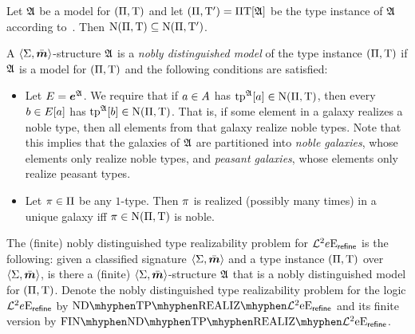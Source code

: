 \begin{remark}\label{rem:str-tpi-noble-sub}
Let $\mathfrak{A}$ be a model for $(\Pi,\mathrm{T})$ and let $(\Pi,{\mathrm{T}'}) =
\Pi\mathrm{T}[\mathfrak{A}]$ be the type instance of $\mathfrak{A}$ according
to~. Then $\mathrm{\mathrm{N}}(\Pi,\mathrm{T}) \subseteq
\mathrm{\mathrm{N}}(\Pi,{\mathrm{T}'})$.
\end{remark}

\begin{definition}
A $\left\langle \mathrm{\Sigma},\bar{\bm{m}} \right\rangle$-structure $\mathfrak{A}$ is a \emph{nobly distinguished model} of
the type instance $(\Pi,\mathrm{T})$ if $\mathfrak{A}$ is a model for $(\Pi,\mathrm{T})$
and the following conditions are satisfied:
\begin{itemize}
  \item[\condrealizd]\label{cond:realizd}
  Let $E = \bm{e}^{\mathfrak{A}}$. We require that if $a \in
  A$ has $\operatorname{tp}^{\mathfrak{A}}[a] \in \mathrm{\mathrm{N}}(\Pi,\mathrm{T})$, then every $b \in E[a]$
  has $\operatorname{tp}^{\mathfrak{A}}[b] \in \mathrm{\mathrm{N}}(\Pi,\mathrm{T})$. That is, if some element in a galaxy
  realizes a noble type, then all elements from that galaxy realize noble types.
  Note that this implies that the galaxies of $\mathfrak{A}$ are partitioned into
  \emph{noble galaxies}, whose elements only realize noble types, and
  \emph{peasant galaxies}, whose elements only realize peasant types.
  \item[\condrealizn]\label{cond:realizn}
  Let $\pi \in \Pi$ be any $1$-type. Then $\pi$ is realized
  (possibly many times) in a unique galaxy iff $\pi \in \mathrm{\mathrm{N}}(\Pi,\mathrm{T})$ is
  noble.
\end{itemize}
\end{definition}

\begin{definition}
The (finite) nobly distinguished type realizability problem for
$\mathcal{L}^{2}{e}\mathrm{E}_{\mathsf{refine}}$ is the following: given a classified signature
$\left\langle \mathrm{\Sigma},\bar{\bm{m}} \right\rangle$ and a type instance $(\Pi,\mathrm{T})$ over $\left\langle \mathrm{\Sigma},\bar{\bm{m}} \right\rangle$,
is there a (finite) $\left\langle \mathrm{\Sigma},\bar{\bm{m}} \right\rangle$-structure $\mathfrak{A}$ that is a nobly
distinguished model for $(\Pi,\mathrm{T})$. Denote the nobly distinguished type
realizability problem for the logic $\mathcal{L}^{2}{e}\mathrm{E}_{\mathsf{refine}}$ by
$\NDReal{\vFo2\Eea\sze\agrefine}$ and its finite version by
$\FinNDReal{\vFo2\Eea\sze\agrefine}$.
\end{definition}

